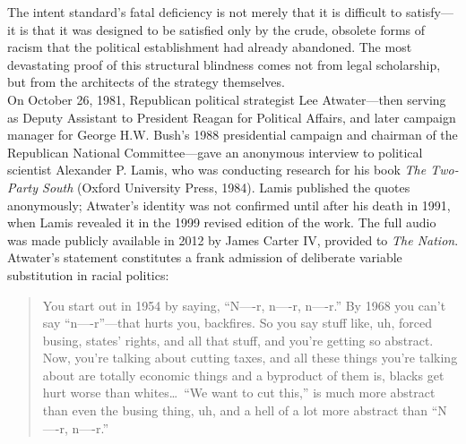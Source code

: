 \documentclass[
]{article}
\begin{document}
The intent standard's fatal deficiency is not merely that it is
difficult to satisfy---it is that it was designed to be satisfied only
by the crude, obsolete forms of racism that the political establishment
had already abandoned. The most devastating proof of this structural
blindness comes not from legal scholarship, but from the architects of
the strategy themselves.\\
On October 26, 1981, Republican political strategist Lee Atwater---then
serving as Deputy Assistant to President Reagan for Political Affairs,
and later campaign manager for George H.W. Bush's 1988 presidential
campaign and chairman of the Republican National Committee---gave an
anonymous interview to political scientist Alexander P. Lamis, who was
conducting research for his book \emph{The Two-Party South} (Oxford
University Press, 1984). Lamis published the quotes anonymously;
Atwater's identity was not confirmed until after his death in 1991, when
Lamis revealed it in the 1999 revised edition of the work. The full
audio was made publicly available in 2012 by James Carter IV, provided
to \emph{The Nation}.\\
Atwater's statement constitutes a frank admission of deliberate variable
substitution in racial politics:

\begin{quote}
You start out in 1954 by saying, ``N----r, n----r, n----r.'' By 1968
you can't say ``n----r''---that hurts you, backfires. So you say stuff
like, uh, forced busing, states' rights, and all that stuff, and you're
getting so abstract. Now, you're talking about cutting taxes, and all
these things you're talking about are totally economic things and a
byproduct of them is, blacks get hurt worse than whites\ldots\ ``We want
to cut this,'' is much more abstract than even the busing thing, uh, and
a hell of a lot more abstract than ``N----r, n----r.''
\end{quote}
\end{document}
